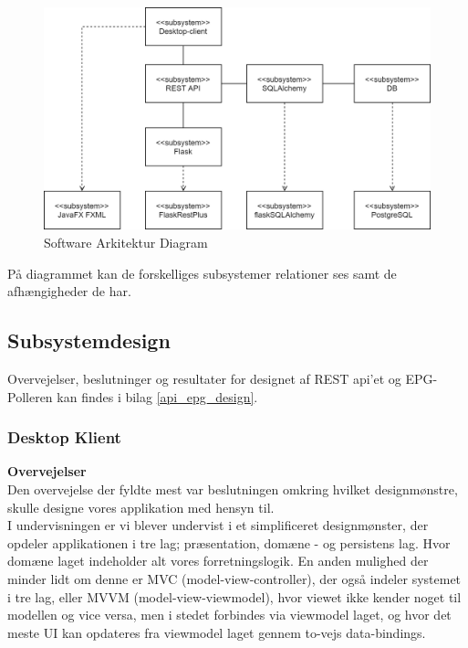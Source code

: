 \begin{figure}[h]
    \centering
    \includegraphics[scale=0.2]{figures/design/domaindiagram-Software Architecture Diagram.png}
    \caption{Software Arkitektur Diagram}
    \label{fig:software-diagram}
\end{figure}{}

På diagrammet kan de forskelliges subsystemer relationer ses samt de afhængigheder de har. 

\subsection{Subsystemdesign}
Overvejelser, beslutninger og resultater for designet af REST api'et og EPG-Polleren kan findes i bilag \ref{api_epg_design}.

\subsubsection{Desktop Klient}
\textbf{Overvejelser}\\
Den overvejelse der fyldte mest var beslutningen omkring hvilket designmønstre,  skulle designe vores applikation med hensyn til.\\
I undervisningen er vi blever undervist i et simplificeret designmønster, der opdeler applikationen i tre lag; præsentation, domæne - og persistens lag. Hvor domæne laget indeholder alt vores forretningslogik. En anden mulighed der minder lidt om denne er MVC (model-view-controller), der også indeler systemet i tre lag, eller MVVM (model-view-viewmodel), hvor viewet ikke kender noget til modellen og vice versa, men i stedet forbindes via viewmodel laget, og hvor det meste UI kan opdateres fra viewmodel laget gennem to-vejs data-bindings.\\

